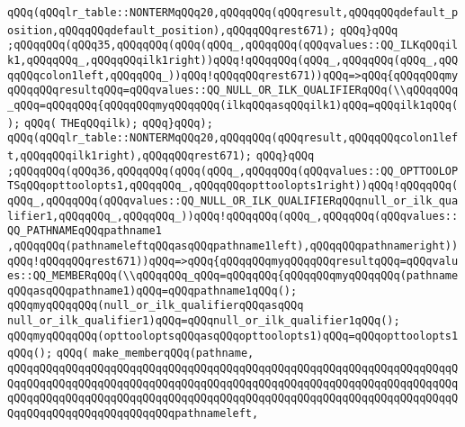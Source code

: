 \verb|qQQq(qQQqlr_table::NONTERMqQQq20,qQQqqQQq(qQQqresult,qQQqqQQqdefault_position,qQQqqQQqdefault_position),qQQqqQQqrest671);|\newline
\verb|qQQq}qQQq|\newline
\verb|;qQQqqQQq(qQQq35,qQQqqQQq(qQQq(qQQq_,qQQqqQQq(qQQqvalues::QQ_ILKqQQqilk1,qQQqqQQq_,qQQqqQQqilk1right))qQQq!qQQqqQQq(qQQq_,qQQqqQQq(qQQq_,qQQqqQQqcolon1left,qQQqqQQq_))qQQq!qQQqqQQqrest671))qQQq=>qQQq{qQQqqQQqmyqQQqqQQqresultqQQq=qQQqvalues::QQ_NULL_OR_ILK_QUALIFIERqQQq(\\qQQqqQQq_qQQq=qQQqqQQq{qQQqqQQqmyqQQqqQQq(ilkqQQqasqQQqilk1)qQQq=qQQqilk1qQQq();|\newline
\verb|qQQq(|\newline
\verb|THEqQQqilk);|\newline
\verb|qQQq}qQQq);|\newline
\verb|qQQq(qQQqlr_table::NONTERMqQQq20,qQQqqQQq(qQQqresult,qQQqqQQqcolon1left,qQQqqQQqilk1right),qQQqqQQqrest671);|\newline
\verb|qQQq}qQQq|\newline
\verb|;qQQqqQQq(qQQq36,qQQqqQQq(qQQq(qQQq_,qQQqqQQq(qQQqvalues::QQ_OPTTOOLOPTSqQQqopttoolopts1,qQQqqQQq_,qQQqqQQqopttoolopts1right))qQQq!qQQqqQQq(qQQq_,qQQqqQQq(qQQqvalues::QQ_NULL_OR_ILK_QUALIFIERqQQqnull_or_ilk_qualifier1,qQQqqQQq_,qQQqqQQq_))qQQq!qQQqqQQq(qQQq_,qQQqqQQq(qQQqvalues::QQ_PATHNAMEqQQqpathname1|\newline
\verb|,qQQqqQQq(pathnameleftqQQqasqQQqpathname1left),qQQqqQQqpathnameright))qQQq!qQQqqQQqrest671))qQQq=>qQQq{qQQqqQQqmyqQQqqQQqresultqQQq=qQQqvalues::QQ_MEMBERqQQq(\\qQQqqQQq_qQQq=qQQqqQQq{qQQqqQQqmyqQQqqQQq(pathnameqQQqasqQQqpathname1)qQQq=qQQqpathname1qQQq();|\newline
\verb|qQQqmyqQQqqQQq(null_or_ilk_qualifierqQQqasqQQq|\newline
\verb|null_or_ilk_qualifier1)qQQq=qQQqnull_or_ilk_qualifier1qQQq();|\newline
\verb|qQQqmyqQQqqQQq(opttooloptsqQQqasqQQqopttoolopts1)qQQq=qQQqopttoolopts1qQQq();|\newline
\verb|qQQq(|\newline
\verb|make_memberqQQq(pathname,|\newline
\verb|qQQqqQQqqQQqqQQqqQQqqQQqqQQqqQQqqQQqqQQqqQQqqQQqqQQqqQQqqQQqqQQqqQQqqQQqqQQqqQQqqQQqqQQqqQQqqQQqqQQqqQQqqQQqqQQqqQQqqQQqqQQqqQQqqQQqqQQqqQQqqQQqqQQqqQQqqQQqqQQqqQQqqQQqqQQqqQQqqQQqqQQqqQQqqQQqqQQqqQQqqQQqqQQqqQQqqQQqqQQqqQQqqQQqqQQqqQQqpathnameleft,|\newline
